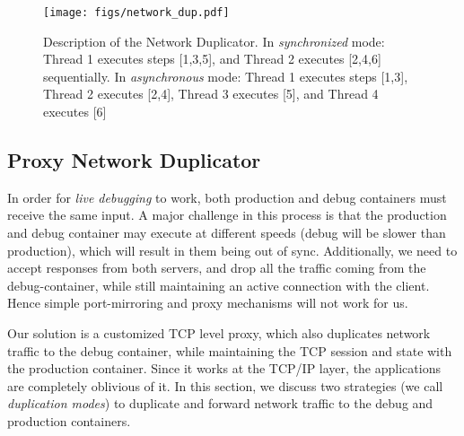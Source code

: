 \begin{figure}[ht]
  \begin{centering}
    \texttt{[image: figs/network\_dup.pdf]}
    \caption{Description of the Network Duplicator. In \textit{synchronized} mode: Thread 1 executes steps [1,3,5], and Thread 2 executes [2,4,6] sequentially. In \textit{asynchronous} mode: Thread 1 executes steps [1,3], Thread 2 executes [2,4], Thread 3 executes [5], and Thread 4 executes [6]}
    \label{fig:duplicator}
  \end{centering}
\end{figure}

\subsection{Proxy Network Duplicator} 
\label{sec:proxyDuplicator}

In order for \textit{live debugging} to work, both production and debug containers must receive the same input.
A major challenge in this process is that the production and debug container may execute at different speeds (debug will be slower than production), which will result in them being out of sync.
Additionally, we need to accept responses from both servers, and drop all the traffic coming from the debug-container, while still maintaining an active connection with the client.
Hence simple port-mirroring and proxy mechanisms will not work for us.

Our solution is a customized TCP level proxy, which also duplicates network traffic to the debug container, while maintaining the TCP session and state with the production container. 
Since it works at the TCP/IP layer, the applications are completely oblivious of it.
In this section, we discuss two strategies (we call \textit{duplication modes}) to duplicate and forward network traffic to the debug and production containers.
%

